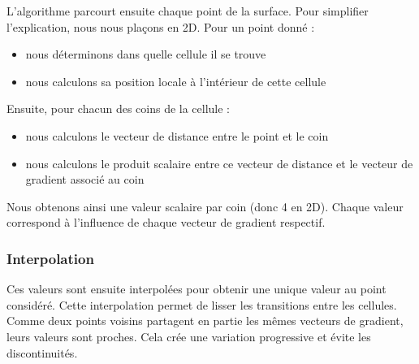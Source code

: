 L’algorithme parcourt ensuite chaque point de la surface. 
Pour simplifier l'explication, nous nous plaçons en 2D.
Pour un point donné :
\begin{itemize}
        \item nous déterminons dans quelle cellule il se trouve
        \item nous calculons sa position locale à l’intérieur de cette cellule
\end{itemize}
Ensuite, pour chacun des coins de la cellule :
\begin{itemize}
        \item nous calculons le vecteur de distance entre le point et le coin
        \item nous calculons le produit scalaire entre ce vecteur de distance et le vecteur de gradient associé au coin
\end{itemize}
Nous obtenons ainsi une valeur scalaire par coin (donc 4 en 2D). Chaque valeur correspond à l’influence de chaque vecteur de gradient respectif.

\subsubsection{Interpolation}

Ces valeurs sont ensuite interpolées pour obtenir une unique valeur au point considéré.
Cette interpolation permet de lisser les transitions entre les cellules. 
Comme deux points voisins partagent en partie les mêmes vecteurs de gradient, leurs valeurs sont proches. 
Cela crée une variation progressive et évite les discontinuités.
